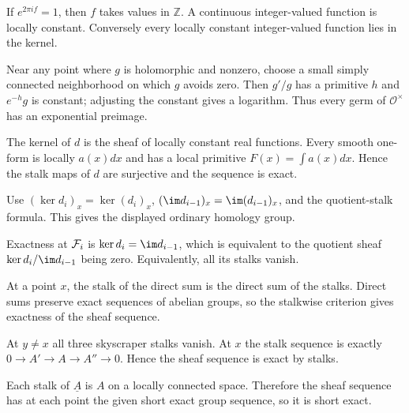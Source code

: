 \begin{solution}[Exercise VI.16.16]
If $e^{2\pi i f}=1$, then $f$ takes values in $\mathbb Z$.  A continuous integer-valued function is locally constant.  Conversely every locally constant integer-valued function lies in the kernel.
\end{solution}

\begin{solution}[Exercise VI.16.17]
Near any point where $g$ is holomorphic and nonzero, choose a small simply connected neighborhood on which $g$ avoids zero.  Then $g'/g$ has a primitive $h$ and $e^{-h}g$ is constant; adjusting the constant gives a logarithm.  Thus every germ of $\mathcal O^\times$ has an exponential preimage.
\end{solution}

\begin{solution}[Exercise VI.16.18]
The kernel of $d$ is the sheaf of locally constant real functions.  Every smooth one-form is locally $a(x)dx$ and has a local primitive $F(x)=\int a(x)dx$.  Hence the stalk maps of $d$ are surjective and the sequence is exact.
\end{solution}

\begin{solution}[Exercise VI.16.19]
Use $(\ker d_i)_x=\ker(d_i)_x$, $(\im d_{i-1})_x=\im(d_{i-1})_x$, and the quotient-stalk formula.  This gives the displayed ordinary homology group.
\end{solution}

\begin{solution}[Exercise VI.16.20]
Exactness at $\mathcal F_i$ is $\ker d_i=\im d_{i-1}$, which is equivalent to the quotient sheaf $\ker d_i/\im d_{i-1}$ being zero.  Equivalently, all its stalks vanish.
\end{solution}

\begin{solution}[Exercise VI.16.21]
At a point $x$, the stalk of the direct sum is the direct sum of the stalks.  Direct sums preserve exact sequences of abelian groups, so the stalkwise criterion gives exactness of the sheaf sequence.
\end{solution}

\begin{solution}[Exercise VI.16.22]
At $y\neq x$ all three skyscraper stalks vanish.  At $x$ the stalk sequence is exactly $0\to A'\to A\to A''\to0$.  Hence the sheaf sequence is exact by stalks.
\end{solution}

\begin{solution}[Exercise VI.16.23]
Each stalk of $\underline A$ is $A$ on a locally connected space.  Therefore the sheaf sequence has at each point the given short exact group sequence, so it is short exact.
\end{solution}

